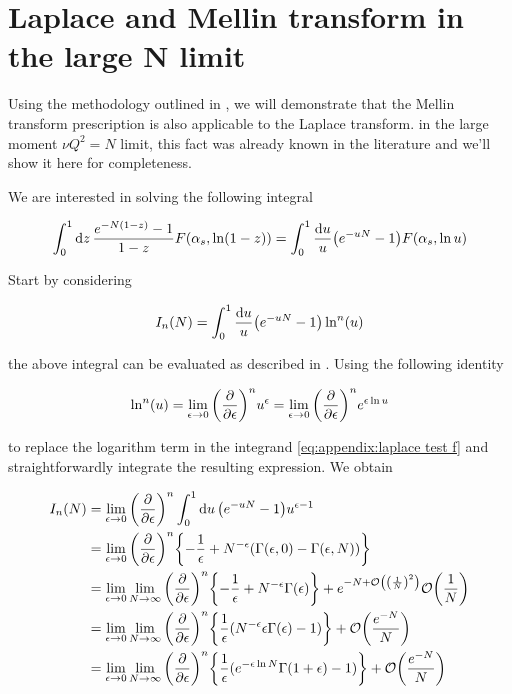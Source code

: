 \documentclass[../main.tex]{subfiles}
\begin{document}
\section{Laplace and Mellin transform in the large N limit} \label{Appendix: Laplace and Mellin transform}

Using the methodology outlined in \cite{Catani_2003_appendix}, we will demonstrate that the Mellin transform prescription is also applicable to the Laplace transform.
in the large moment $\nu Q^2 = N$ limit, this fact was already known in the literature \cite{CATAN_large_chi} and we'll show it here for completeness.

We are interested in solving the following integral

\begin{equation}
    \int_0^1 \dd{z} \frac{e^{- N (1-z)} - 1}{1-z} F\qty(\alpha_s,\ln(1-z))= \int_0^1 \frac{\dd{u}}{u} \qty(e^{-u N} - 1) F\qty(\alpha_s , \ln u)
\end{equation}

Start by considering 

\begin{equation}\label{eq:appendix:laplace test f}
    I_n(N) = \int_0^1 \frac{\dd{u}}{u} \qty(e^{-u N} - 1) \ln^n(u) 
\end{equation}

the above integral can be evaluated as described in \cite{CATANI1989323}. Using the following identity

\begin{equation}
    \ln^n(u)= \lim_{\epsilon \to 0} \qty(\pdv{\epsilon})^n u^\epsilon = \lim_{\epsilon \to 0} \qty(\pdv{\epsilon})^n e^{\epsilon \ln u}
\end{equation}

to replace the logarithm term in the integrand \cref{eq:appendix:laplace test f} and straightforwardly integrate the resulting expression. We obtain

\begin{align}
    \begin{split}\label{eq:appendix:calculation}
    I_n(N) &= \lim_{\epsilon \to 0} \qty(\pdv{\epsilon})^n \int_0^1 \dd{u} \qty(e^{-u N} - 1) u^{\epsilon-1} \\
    &= \lim_{\epsilon \to 0} \qty(\pdv{\epsilon})^n \qty{-\frac{1}{\epsilon}+N^{-\epsilon} (\Gamma(\epsilon,0) - \Gamma(\epsilon,N))} \\
    &= \lim_{\epsilon \to 0} \lim_{N \to \infty} \qty(\pdv{\epsilon})^n \qty{-\frac{1}{\epsilon}+N^{-\epsilon} \Gamma(\epsilon)}+ e^{-N + \order{\qty(\frac{1}{N})^2}}\order{\frac{1}{N}} \\
    &= \lim_{\epsilon \to 0} \lim_{N \to \infty} \qty(\pdv{\epsilon})^n \qty{\frac{1}{\epsilon} (N^{-\epsilon} \epsilon \Gamma(\epsilon) -1)} + \order{\frac{e^{-N}}{N}}\\
    &= \lim_{\epsilon \to 0} \lim_{N \to \infty} \qty(\pdv{\epsilon})^n \qty{\frac{1}{\epsilon} ( e^{-\epsilon \ln N} \Gamma(1+\epsilon) -1)} + \order{\frac{e^{-N}}{N}}
    \end{split}
\end{align}
\end{document}
